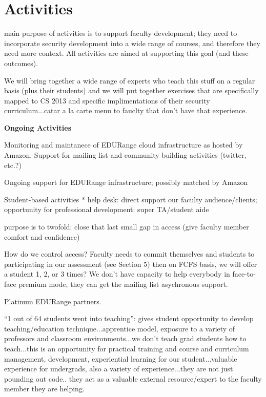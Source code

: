 \section*{Activities}

main purpose of activities is to support faculty development; they need to incorporate security development into a wide range of courses,
and therefore they need more context. All activities are aimed at supporting this goal (and these outcomes).

We will bring together a wide range of experts who teach this stuff on a regular basis (plus their students) and we will put together
exercises that are specifically mapped to CS 2013 and specific implimentations of their security curriculum...catar a la carte menu to
fauclty that don't have that experience.

{\bf Ongoing Activities}

Monitoring and maintanece of EDURange cloud infrastructure as hosted
by Amazon. Support for mailing list and community building activities
(twitter, etc.?)

Ongoing support for EDURange infrastructure; possibly matched by Amazon


Student-based activities
 * help desk: direct support our faculty audience/clients; opportunity for professional development: super TA/student aide

 purpose is to twofold: close that last small gap in access (give faculty member comfort and confidence)

How do we control access? Faculty needs to commit themselves and students to participating in our assessment (see Section 5) then
on FCFS basis, we will offer a student 1, 2, or 3 times? We don't have capacity to help everybody in face-to-face premium mode, they
can get the mailing list asychronous support.

Platinum EDURange partners.

``1 out of 64 students went into teaching'': gives student opportunity to develop teaching/education technique...apprentice model, exposure
to a variety of professors and classroom environments...we don't teach grad students how to teach...this is an opportunity for practical
training and course and curriculum management, development, experiential learning for our student...valuable experience for undergrads, also
a variety of experience...they are not just pounding out code.. they act as a valuable external resource/expert to the faculty member they are
helping.

